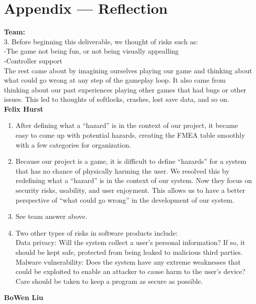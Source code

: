 \documentclass{article}
\begin{document}
\section*{Appendix --- Reflection}
\textbf{Team:}\\
3. Before beginning this deliverable, we thought of risks such as:\\
-The game not being fun, or not being visually appealling\\
-Controller support\\
The rest came about by imagining ourselves playing our game and thinking about what could go wrong at any step of the gameplay loop. It also came from thinking about our past experiences playing other games that had bugs or other issues. This led to thoughts of softlocks, crashes, lost save data, and so on.\\
\textbf{Felix Hurst}
\begin{enumerate}
\item{After defining what a “hazard” is in the context of our project, it became easy to come up with potential hazards, creating the FMEA table smoothly with a few categories for organization.}
\item{Because our project is a game, it is difficult to define “hazards” for a system that has no chance of physically harming the user. We resolved this by redefining what a “hazard” is in the context of our system. Now they focus on security risks, usability, and user enjoyment. This allows us to have a better perspective of “what could go wrong” in the development of our system.}
\item{See team answer above.}
\item{Two other types of risks in software products include:\\
Data privacy: Will the system collect a user’s personal information? If so, it should be kept safe, protected from being leaked to malicious third parties.\\
Malware vulnerability: Does the system have any extreme weaknesses that could be exploited to enable an attacker to cause harm to the user’s device? Care should be taken to keep a program as secure as possible.}
\end{enumerate}
\textbf{BoWen Liu}
\end{document}
